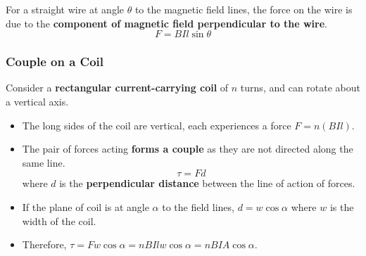 For a straight wire at angle $\theta$ to the magnetic field lines, the force on the wire is due to the \textbf{component of magnetic field perpendicular to the wire}.
$$F=BIl\sin\theta$$

\subsubsection*{Couple on a Coil}

Consider a \textbf{rectangular current-carrying coil} of $n$ turns, and can rotate about a vertical axis.
\begin{itemize}
    \item The long sides of the coil are vertical, each experiences a force $F=n(BIl)$.
    \item The pair of forces acting \textbf{forms a couple} as they are not directed along the same line.
        $$\tau=Fd$$
        where $d$ is the \textbf{perpendicular distance} between the line of action of forces.
    \item If the plane of coil is at angle $\alpha$ to the field lines, $d=w\cos\alpha$ where $w$ is the width of the coil.
    \item Therefore, $\tau=Fw\cos\alpha=nBIlw\cos\alpha=nBIA\cos\alpha$.
\end{itemize}
